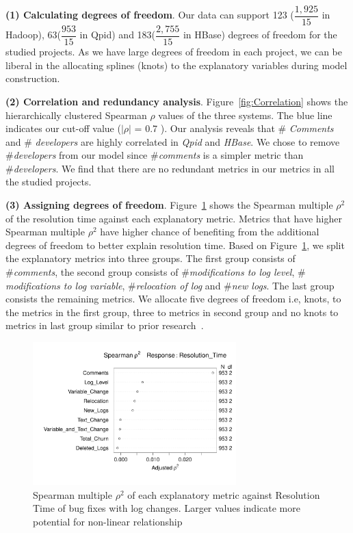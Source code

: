 \textbf{(1) Calculating degrees of freedom}. Our data can support 123 ($\dfrac{1,925}{15}$ in Hadoop), 63($\dfrac{953}{15}$ in Qpid) and 183($\dfrac{2,755}{15} $ in HBase) degrees of freedom for the studied projects. As we have large degrees of freedom in each project, we can be liberal in the allocating splines (knots) to the explanatory variables during model construction. 


\textbf{{(2) Correlation and redundancy analysis}}. Figure~\ref{fig:Correlation} shows the hierarchically clustered Spearman $\rho$ values of the three systems. The blue line indicates our cut-off value ($|\rho|$ = 0.7 ). Our analysis reveals that \# \textsl{Comments} and \# \textsl{developers} are highly correlated in \emph{Qpid} and \emph{HBase}. We chose to remove \#\textsl{developers} from our model since \#\textsl{comments} is a simpler metric than \#\textsl{developers}. We find that there are no redundant metrics in our metrics in all the studied projects.


\textbf{(3) Assigning degrees of freedom}. Figure~\ref{fig:Spearman} shows the Spearman multiple $\rho^{2}$ of the resolution time against each explanatory metric. Metrics that have higher Spearman multiple $\rho^{2}$ have higher chance of benefiting from the additional degrees of freedom to better explain resolution time. Based on Figure~\ref{fig:Spearman}, we split the explanatory metrics into three groups. The first group consists of \#\textsl{comments}, the second group consists of \#\textsl{modifications to log level}, \#\textsl{ modifications to log variable}, \#\textsl{relocation of log} and \#\textsl{new logs}. The last group consists the remaining metrics. We allocate five degrees of freedom i.e, knots, to the metrics in the first group, three to metrics in second group and no knots to metrics in last group similar to prior research~\cite{ShaneOLS}.


\begin{figure}[t]
	\begin{minipage}[b]{1\columnwidth}
			\centering 
		\hspace*{-2cm}	\includegraphics[width=0.7\textwidth]{QpidDF}	
		
	\end{minipage}
	\captionsetup{labelsep = colon}
	\hspace*{1.7cm}\caption{Spearman multiple $\rho^{2}$ of each explanatory metric against Resolution Time of bug fixes with log changes. Larger values indicate more potential for non-linear relationship \label{fig:Spearman}}
\end{figure}




